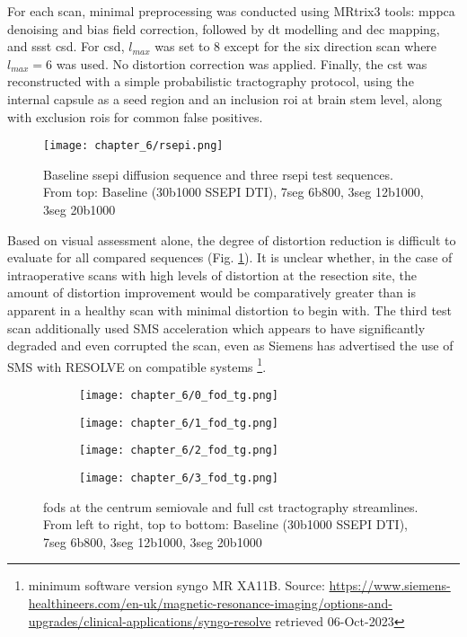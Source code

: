 For each scan, minimal preprocessing was conducted using MRtrix3\autocite{Tournier2019} tools:
\Gls{mppca} denoising and bias field correction, followed by \gls{dt} modelling and \gls{dec} mapping, and \gls{ssst} \gls{csd}.
For \gls{csd}, $l_{max}$ was set to 8 except for the six direction scan where $l_{max}=6$ was used.
No distortion correction was applied.
Finally, the \gls{cst} was reconstructed with a simple probabilistic tractography protocol, using the internal capsule as a seed region and an inclusion \gls{roi} at brain stem level, along with exclusion \glspl{roi} for common false positives.

\begin{figure}[h!]
  \centering
  \texttt{[image: chapter\_6/rsepi.png]}
  \caption{Baseline \gls{ssepi} diffusion sequence and three \gls{rsepi} test sequences. From top: Baseline (30\x b1000 SSEPI DTI), 7seg 6\x b800, 3seg 12\x b1000, 3seg 20\x b1000}
  \label{fig:rsepi}
\end{figure}

Based on visual assessment alone, the degree of distortion reduction is difficult to evaluate for all compared sequences (Fig. \ref{fig:rsepi}).
It is unclear whether, in the case of intraoperative scans with high levels of distortion at the resection site, the amount of distortion improvement would be comparatively greater than is apparent in a healthy scan with minimal distortion to begin with.
The third test scan additionally used SMS acceleration which appears to have significantly degraded and even corrupted the scan, even as Siemens has advertised the use of SMS with RESOLVE on compatible systems
\footnote[2]{minimum software version syngo MR XA11B. Source: \url{https://www.siemens-healthineers.com/en-uk/magnetic-resonance-imaging/options-and-upgrades/clinical-applications/syngo-resolve} retrieved 06-Oct-2023}.


\begin{figure}[h!]
  \centering
  \begin{subfigure}{0.5\textwidth}
    \texttt{[image: chapter\_6/0\_fod\_tg.png]}
  \end{subfigure}%
  \begin{subfigure}{0.5\textwidth}
    \texttt{[image: chapter\_6/1\_fod\_tg.png]}
  \end{subfigure}
  \begin{subfigure}{0.5\textwidth}
    \texttt{[image: chapter\_6/2\_fod\_tg.png]}
  \end{subfigure}%
  \begin{subfigure}{0.5\textwidth}
    \texttt{[image: chapter\_6/3\_fod\_tg.png]}
  \end{subfigure}
  \caption{\glspl{fod} at the centrum semiovale and full \gls{cst} tractography streamlines. From left to right, top to bottom: Baseline (30\x b1000 SSEPI DTI), 7seg 6\x b800, 3seg 12\x b1000, 3seg 20\x b1000}
  \label{fig:rsepi-fod}
\end{figure}

